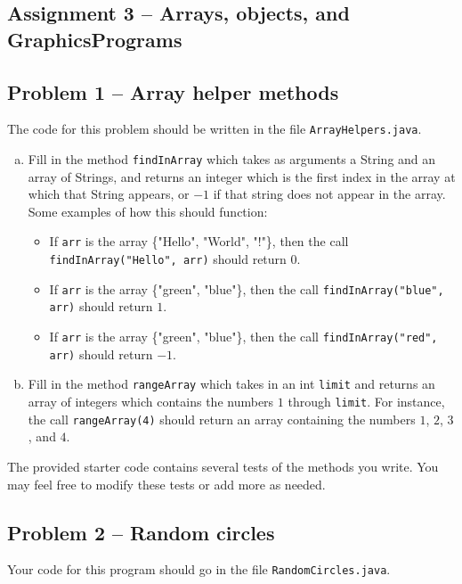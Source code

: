 \documentclass[11pt]{article}
\theoremstyle{plain}
\theoremstyle{definition}
\theoremstyle{remark}
\begin{document}
\begin{center}
\section*{Assignment 3 -- Arrays, objects, and GraphicsPrograms}
\end{center}
\subsection*{Problem 1 -- Array helper methods}
The code for this problem should be written in the file
\texttt{ArrayHelpers.java}.
\begin{enumerate}[(a)]
  \item Fill in the method \texttt{findInArray} which takes as arguments a
    String and an array of Strings, and returns an integer which is the first
    index in the array at which that String appears, or $-1$ if that string does
    not appear in the array. Some examples of how this should function:
    \begin{itemize}
      \item If \texttt{arr} is the array \{"Hello", "World", "!"\}, then the
        call \texttt{findInArray("Hello", arr)} should return $0$.
      \item If \texttt{arr} is the array \{"green", "blue"\}, then the
        call \texttt{findInArray("blue", arr)} should return $1$.
      \item If \texttt{arr} is the array \{"green", "blue"\}, then the
        call \texttt{findInArray("red", arr)} should return $-1$.
    \end{itemize}
  \item Fill in the method \texttt{rangeArray} which takes in an int
    \texttt{limit} and returns an array of integers which contains the numbers
    $1$ through {\tt limit}. For instance, the call {\tt rangeArray(4)} should
    return an array containing the numbers $1$, $2$, $3$, and $4$.
\end{enumerate}
The provided starter code contains several tests of the methods you write. You
may feel free to modify these tests or add more as needed.
\subsection*{Problem 2 -- Random circles}
Your code for this program should go in the file {\tt RandomCircles.java}.
\end{document}
